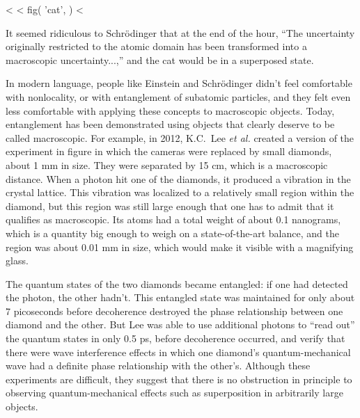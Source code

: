 <%
<%
  fig(
    'cat',
  )
<%

\noindent It seemed ridiculous to Schr\"odinger that at the end of
the hour, ``The uncertainty originally restricted to the atomic domain
has been transformed into a macroscopic uncertainty...,'' and the cat
would be in a superposed state. 

In modern language, people like Einstein and Schr\"odinger didn't feel
comfortable with nonlocality, or with entanglement of subatomic
particles, and they felt even less comfortable with applying these
concepts to macroscopic objects. Today, entanglement has been
demonstrated using objects that clearly deserve to be called
macroscopic.\label{macroscopic-entanglement}
For example, in 2012, K.C.~Lee \emph{et al.} created a
version of the experiment in figure  in which
the cameras were replaced by small diamonds, about 1 mm in size.  They
were separated by 15 cm, which is a macroscopic distance. When a
photon hit one of the diamonds, it produced a vibration in the crystal
lattice.  This vibration was localized to a relatively small region
within the diamond, but this region was still large enough that one
has to admit that it qualifies as macroscopic. Its atoms had a total
weight of about 0.1 nanograms, which is a quantity big enough to weigh
on a state-of-the-art balance, and the region was about 0.01 mm in
size, which would make it visible with a magnifying glass. 

The quantum states of the two diamonds became entangled: if one had
detected the photon, the other hadn't. This entangled state was
maintained for only about 7 picoseconds before decoherence destroyed
the phase relationship between one diamond and the other. But Lee was
able to use additional photons to ``read out'' the quantum states in
only 0.5 ps, before decoherence occurred, and verify that there were
wave interference effects in which one diamond's quantum-mechanical
wave had a definite phase relationship with the other's.  Although
these experiments are difficult, they suggest that there is no
obstruction in principle to observing quantum-mechanical effects such
as superposition in arbitrarily large objects. 

